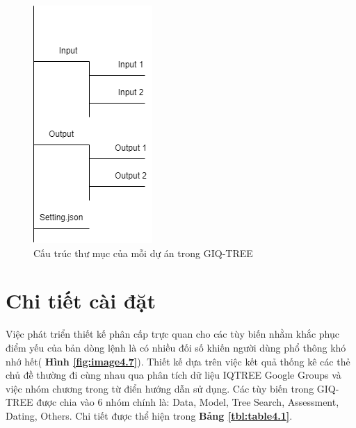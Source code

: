 \documentclass[12pt]{report}
\begin{document}
\begin{figure}[h]
	\centering
	\includegraphics[scale=1]{Image/4.6.png}
	\caption{Cấu trúc thư mục của mỗi dự án trong GIQ-TREE }
	\label{fig:image4.6}
\end{figure}

\section{Chi tiết cài đặt}
Việc phát triển thiết kế phân cấp trực quan cho các tùy biến nhằm khắc phục điểm yếu của bản dòng lệnh là có nhiều đối số khiến người dùng phổ thông khó nhớ hết( \textbf{Hình \ref{fig:image4.7}}). Thiết kế dựa trên việc kết quả thống kê các thẻ chủ đề thường đi cùng nhau qua phân tích dữ liệu IQTREE Google Groups và việc nhóm chương trong từ điển hướng dẫn sử dụng. Các tùy biến trong GIQ-TREE được chia vào 6 nhóm chính là: Data, Model, Tree Search, Assessment, Dating, Others. Chi tiết được thể hiện trong  \textbf{Bảng \ref{tbl:table4.1}}.
\end{document}

